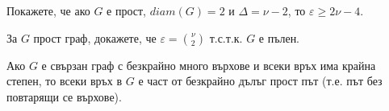 \begin{problem}%
  Покажете, че ако $G$ е прост, $diam(G) = 2$ и $\Delta = \nu - 2$, то $\varepsilon \geq 2\nu - 4$.
\end{problem}

\begin{problem}
  За $G$ прост граф, докажете, че $\varepsilon = \binom{\nu}{2}$ т.с.т.к. $G$ е пълен.
\end{problem}

\begin{lemma}
  Ако $G$ е свързан граф с безкрайно много върхове и всеки връх има крайна степен, то всеки връх в $G$ е част от 
  безкрайно дълъг прост път (т.е. път без повтарящи се върхове).
\end{lemma}



